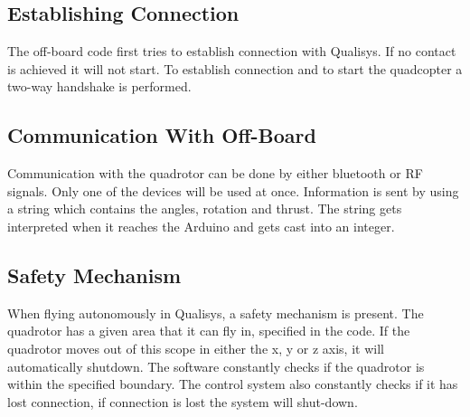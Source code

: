 \subsection{Establishing Connection}
The off-board code first tries to establish connection with Qualisys. If no contact is achieved it will not start. To establish connection and to start the quadcopter a two-way handshake is performed.

\subsection{Communication With Off-Board}
Communication with the quadrotor can be done by either bluetooth or RF signals. Only one of the devices will be used at once. Information is sent by using a string which contains the angles, rotation and thrust. The string gets interpreted when it reaches the Arduino and gets cast into an integer.

\subsection{Safety Mechanism}

When flying autonomously in Qualisys, a safety mechanism is present. The quadrotor has a given area that it can fly in, specified in the code. If the quadrotor moves out of this scope in either the x, y or z axis, it will automatically shutdown. The software constantly checks if the quadrotor is within the specified boundary. The control system also constantly checks if it has lost connection, if connection is lost the system will shut-down.